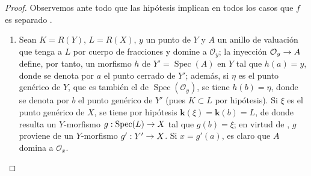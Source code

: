\documentclass[oneside,10pt]{amsart}
\makeatletter
\newcommand{\ega@arrow}[2]{\mathchoice{#1}{#2}{#2}{#2}}
\renewcommand{\to}{\ega@arrow{\longrightarrow}{\rightarrow}}
\makeatother
\begin{document}
\begin{proof}
Observemos ante todo que las hipótesis implican en todos los casos que $f$ es separado .
\begin{enumerate}
  \item[\rm{(i)}] Sean $K=R(Y)$, $L=R(X)$, $y$ un punto de $Y$ y $A$ un anillo de valuación que tenga a $L$ por cuerpo de fracciones y domine a $\mathcal{O}_y$;
  la inyección $\mathcal{O}_y\to A$ define, por tanto, un morfismo $h$ de $Y'=\operatorname{Spec}(A)$ en $Y$  tal que $h(a)=y$, donde se denota por $a$ el punto cerrado de $Y'$;
  además, si $\eta$ es el punto genérico de $Y$, que es también el de $\operatorname{Spec}(\mathcal{O}_y)$, se tiene $h(b)=\eta$, donde se denota por $b$ el punto genérico de $Y'$ (pues $K\subset L$ por hipótesis).
  Si $\xi$ es el punto genérico de $X$, se tiene por hipótesis $\boldsymbol{k}(\xi)=\boldsymbol{k}(b)=L$, de donde resulta un $Y$-morfismo $g:\operatorname{Spec}(L)\to X$ tal que $g(b)=\xi$;
  en virtud de , $g$ proviene de un $Y$-morfismo $g':Y'\to X$.
  Si $x=g'(a)$, es claro que $A$ domina a $\mathcal{O}_x$.


\end{enumerate}
\end{proof}
\end{document}
